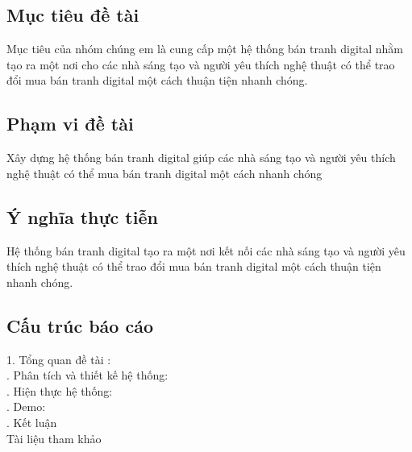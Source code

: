 \documentclass{article}
\begin{document}
\subsection{Mục tiêu đề tài}
{\large
Mục tiêu của nhóm chúng em là cung cấp một hệ thống bán tranh digital nhằm tạo ra một nơi cho các nhà sáng tạo và người yêu thích nghệ thuật có thể trao đổi mua bán tranh digital một cách thuận tiện nhanh chóng.}
\subsection{Phạm vi đề tài}
{\large
Xây dựng hệ thống bán tranh digital giúp các nhà sáng tạo và người yêu thích nghệ thuật có thể mua bán tranh digital một cách nhanh chóng}
\subsection{Ý nghĩa thực tiễn}
{\large
Hệ thống bán tranh digital tạo ra một nơi kết nối các nhà sáng tạo và người yêu thích nghệ thuật có thể trao đổi mua bán tranh digital một cách thuận tiện nhanh chóng.}

\subsection{Cấu trúc báo cáo}
{\large
	1. Tổng quan đề tài :\\
. Phân tích và thiết kế hệ thống:\\
. Hiện thực hệ thống:\\
. Demo:\\
. Kết luận\\
\indent	Tài liệu tham khảo\\




}
\end{document}
